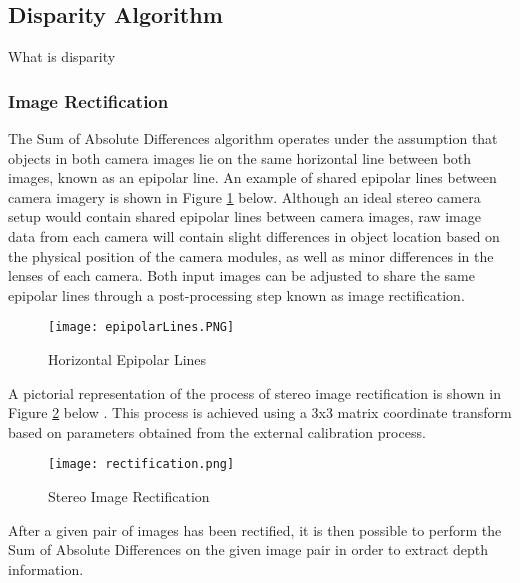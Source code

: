 \subsection{Disparity Algorithm}
What is disparity
\subsubsection{Image Rectification}
The Sum of Absolute Differences algorithm operates under the assumption that objects in both camera images lie on the same horizontal line between both images, known as an epipolar line. An example of shared epipolar lines between camera imagery is shown in Figure \ref{epipolarLines} below. Although an ideal stereo camera setup would contain shared epipolar lines between camera images, raw image data from each camera will contain slight differences in object location based on the physical position of the camera modules, as well as minor differences in the lenses of each camera. Both input images can be adjusted to share the same epipolar lines through a post-processing step known as image rectification. 
\par
\begin{figure}[H]
	\centerline{\texttt{[image: epipolarLines.PNG]}}
	\caption{Horizontal Epipolar Lines \cite{collins}}
	\label{epipolarLines}
\end{figure}
\par
A pictorial representation of the process of stereo image rectification is shown in Figure \ref{rectification} below \cite{mattoccia_slides}. This process is achieved using a 3x3 matrix coordinate transform based on parameters obtained from the external calibration process. 
\begin{figure}[H]
	\centerline{\texttt{[image: rectification.png]}}
	\caption{Stereo Image Rectification \cite{mattoccia_slides}}
	\label{rectification}
\end{figure}
\par
After a given pair of images has been rectified, it is then possible to perform the Sum of Absolute Differences on the given image pair in order to extract depth information. 
